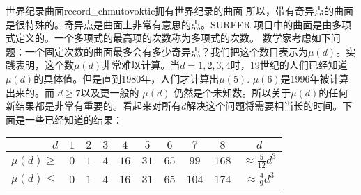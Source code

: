 \begin{surferIntroPage}{世界纪录曲面}{record_chmutovoktic}{拥有世界纪录的曲面}
所以，带有奇异点的曲面是很特殊的。奇异点是曲面上非常有意思的点。SURFER 项目中的曲面是由多项式定义的。一个多项式的最高项的次数称为多项式的次数。
数学家考虑如下问题：一个固定次数的曲面最多会有多少奇异点？我们把这个数目表示为$\mu(d)$。实践表明，这个数$\mu(d)$非常难以计算。当$d=1,2,3,4$时，19世纪的人们已经知道$\mu(d)$的具体值。但是直到1980年，人们才计算出$\mu(5)$.
$\mu(6)$是1996年被计算出来的。而 $d\ge 7$以及更一般的 $\mu(d)$ 仍然是个未知数。所以关于$\mu(d)$的任何新结果都是非常有重要的。看起来对所有$d$解决这个问题将需要相当长的时间。下面是一些已经知道的结果：
   \begin{center}
      \begin{tabular}{r|cccccccc|c}
        $d$ & $1$ & $2$ & $3$ & $4$ & $5$ & $6$ & $7$ & $8$ & $d$\\
        \hline
        \hline
        \rule{0pt}{1.2em}$\mu(d)\ge$ & $0$ & $1$ & $4$ & $16$ & $31$ & $65$ &
        $99$ & $168$ &
        $\approx \frac{5}{12}d^3$\\[0.3em]
        \hline
        \rule{0pt}{1.2em}$\mu(d)\le$ & $0$ & $1$ & $4$ & $16$ & $31$ & $65$ &
        $104$ & $174$ & $\approx \frac{4}{9}d^3$
      \end{tabular}
    \end{center}
\end{surferIntroPage}
